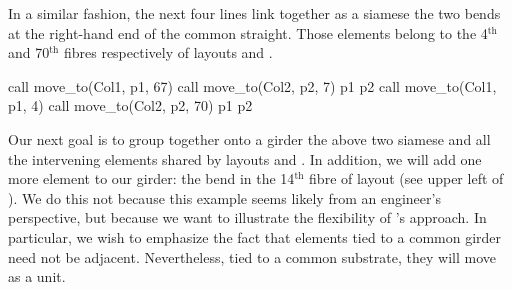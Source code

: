 In a similar fashion, the next four lines link together as a
siamese the two bends at the right-hand end of the common straight.
Those elements belong to the 4$^\text{th}$ and 70$^\text{th}$
fibres respectively of layouts  and .
%
\begin{ptccode}
call move_to(Col1, p1, 67)
call move_to(Col2, p2, 7)
p1%
p2%
call move_to(Col1, p1, 4)
call move_to(Col2, p2, 70)
p1%
p2%
\end{ptccode}

\enlargethispage{\baselineskip}
Our next goal is to group together onto a girder the above two
siamese and all the intervening elements shared by layouts
 and . In addition, we will add one more
element to our girder: the bend in the 14$^\text{th}$ fibre of
layout  (see upper left of ). We do
this not because this example seems likely from an engineer's
perspective, but because we want to illustrate the flexibility
of \PTC's approach. In particular, we wish to emphasize the
fact that elements tied to a common girder need not be adjacent.
Nevertheless, tied to a common substrate, they will move as a unit.

